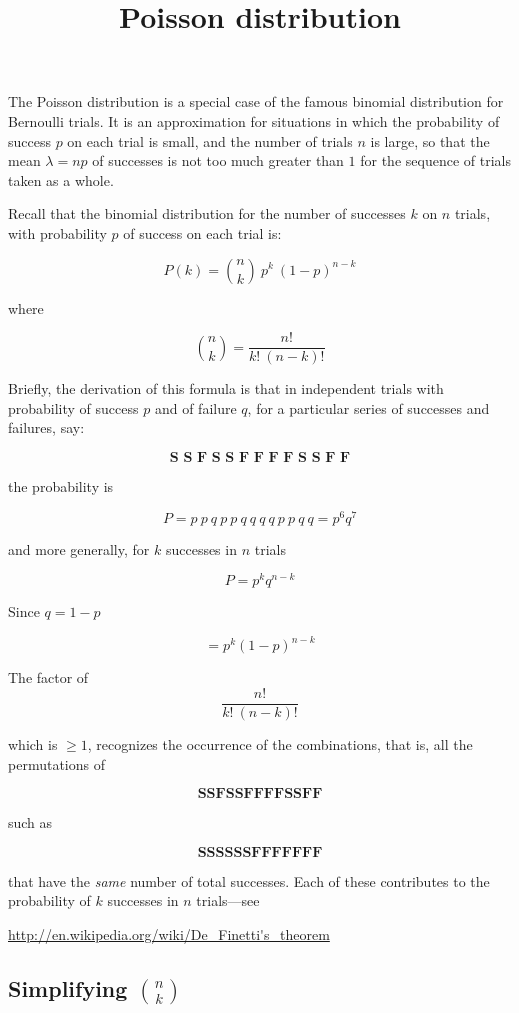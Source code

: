 \documentclass[11pt, oneside]{article}
\title{Poisson distribution}
\date{}
\begin{document}
\maketitle
\Large

The Poisson distribution is a special case of the famous binomial distribution for Bernoulli trials.  It is an approximation for situations in which the probability of success $p$ on each trial is small, and the number of trials $n$ is large, so that the mean $\lambda = np$ of successes is not too much greater than $1$ for the sequence of trials taken as a whole.

Recall that the binomial distribution for the number of successes $k$ on $n$ trials, with probability $p$ of success on each trial is:

\[ P(k) = {n\choose k} \  p^k \  (1-p)^{n-k} \]

where

\[ {n\choose k} =  \frac{n!}{k!  \ (n-k)!}  \]

Briefly, the derivation of this formula is that in independent trials with probability of success $p$ and of failure $q$, for a particular series of successes and failures, say:

\[ \textbf{S\ S\ F\ S\ S\ F\ F\ F\ F\ S\ S\ F\ F} \]

the probability is

\[ P = p \ p \ q \ p \ p \ q \ q \ q \ q \ p \ p \ q \ q = p^6 q^7 \]

and more generally, for $k$ successes in $n$ trials

\[ P = p^k q^{n-k} \]

Since $q = 1-p$

\[ = p^k (1-p)^{n-k} \]

The factor of
\[ \frac{n!}{ k! \ (n-k)! } \] 

which is $\ge 1$, recognizes the occurrence of the combinations, that is, all the permutations of 

\[ \textbf{SSFSSFFFFSSFF} \]

such as 

\[ \textbf{SSSSSSFFFFFFF} \]

 that have the \emph{same} number of total successes.  Each of these contributes to the probability of $k$ successes in $n$ trials---see
 
\url{http://en.wikipedia.org/wiki/De_Finetti's_theorem}

\subsection*{Simplifying ${n\choose k}$}
\end{document}
